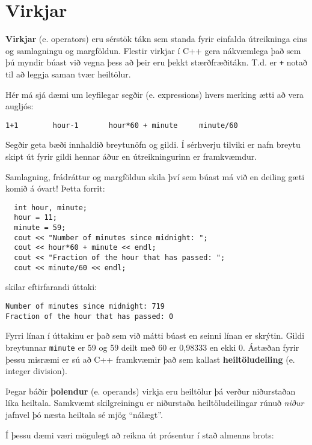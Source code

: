 \section{Virkjar}

{\bf Virkjar} (e. operators) eru sérstök tákn sem standa fyrir einfalda útreikninga eins og samlagningu og margföldun.
Flestir virkjar í C++ gera nákvæmlega það sem þú myndir búast við vegna þess að þeir eru þekkt stærðfræðitákn.
T.d. er {\tt +} notað til að leggja saman tvær heiltölur.

Hér má sjá dæmi um leyfilegar segðir (e. expressions) hvers merking ætti að vera augljós:

\begin{verbatim}
1+1        hour-1       hour*60 + minute     minute/60
\end{verbatim}
%
Segðir geta bæði innhaldið breytunöfn og gildi.
Í sérhverju tilviki er nafn breytu skipt út fyrir gildi hennar áður en útreikningurinn er framkvæmdur.


Samlagning, frádráttur og margföldun skila því sem búast má við en deiling gæti komið á óvart!
Þetta forrit:

\begin{verbatim}
  int hour, minute;
  hour = 11;
  minute = 59;
  cout << "Number of minutes since midnight: ";
  cout << hour*60 + minute << endl;
  cout << "Fraction of the hour that has passed: ";
  cout << minute/60 << endl;
\end{verbatim}
%
skilar eftirfarandi úttaki:

\begin{verbatim}
Number of minutes since midnight: 719
Fraction of the hour that has passed: 0
\end{verbatim}
%
Fyrri línan í úttakinu er það sem við mátti búast en seinni línan er skrýtin.
Gildi breytunnar {\tt minute} er 59 og 59 deilt með 60 er 0,98333 en ekki 0.
Ástæðan fyrir þessu misræmi er sú að C++ framkvæmir það sem kallast {\bf heiltöludeiling} (e. integer division).


Þegar báðir {\bf þolendur} (e. operands) virkja eru heiltölur þá verður niðurstaðan líka heiltala.
Samkvæmt skilgreiningu er niðurstaða heiltöludeilingar rúnuð {\em niður} jafnvel þó næsta heiltala sé mjög ``nálægt''.

Í þessu dæmi væri mögulegt að reikna út prósentur í stað almenns brots:

